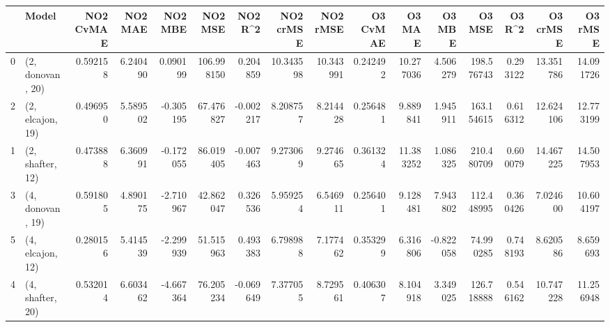 \begin{tabular}{llrrrrrrrrrrrrrr}
\toprule
{} &             Model &  NO2 CvMAE &   NO2 MAE &   NO2 MBE &     NO2 MSE &   NO2 R\textasciicircum2 &  NO2 crMSE &   NO2 rMSE &  O3 CvMAE &     O3 MAE &    O3 MBE &      O3 MSE &    O3 R\textasciicircum2 &   O3 crMSE &    O3 rMSE \\
\midrule
0 &  (2, donovan, 20) &   0.592158 &  6.240490 &  0.090199 &  106.998150 &  0.204859 &  10.343598 &  10.343991 &  0.242492 &  10.277036 &  4.506279 &  198.576743 &  0.293122 &  13.351786 &  14.091726 \\
2 &  (2, elcajon, 19) &   0.496950 &  5.589502 & -0.305195 &   67.476827 & -0.002217 &   8.208757 &   8.214428 &  0.256481 &   9.889841 &  1.945911 &  163.154615 &  0.616312 &  12.624106 &  12.773199 \\
1 &  (2, shafter, 12) &   0.473888 &  6.360991 & -0.172055 &   86.019405 & -0.007463 &   9.273069 &   9.274665 &  0.361324 &  11.383252 &  1.086325 &  210.480709 &  0.600079 &  14.467225 &  14.507953 \\
3 &  (4, donovan, 19) &   0.591805 &  4.890175 & -2.710967 &   42.862047 &  0.326536 &   5.959254 &   6.546911 &  0.256401 &   9.128481 &  7.943802 &  112.448995 &  0.360426 &   7.024600 &  10.604197 \\
5 &  (4, elcajon, 12) &   0.280156 &  5.414539 & -2.299939 &   51.515963 &  0.493383 &   6.798988 &   7.177462 &  0.353299 &   6.316806 & -0.822058 &   74.990285 &  0.748193 &   8.620586 &   8.659693 \\
4 &  (4, shafter, 20) &   0.532014 &  6.603462 & -4.667364 &   76.205234 & -0.069649 &   7.377055 &   8.729561 &  0.406307 &   8.104918 &  3.349025 &  126.718888 &  0.546162 &  10.747228 &  11.256948 \\
\bottomrule
\end{tabular}
